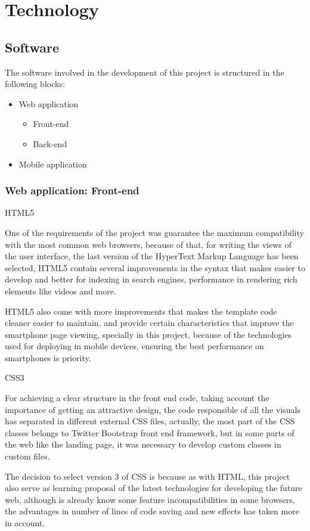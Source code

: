 \documentclass{DeustoFDP}
\begin{document}
\section{Technology}
\subsection{Software}
The software involved in the development of this project is structured in the following blocks:
\begin{itemize}
	\item Web application
	\begin{itemize}
		\item Front-end
		\item Back-end
	\end{itemize}
	\item Mobile application
\end{itemize}

\subsubsection{Web application: Front-end}
{\large HTML5}

One of the requirements of the project was guarantee the maximum compatibility with the most common web browsers, because of that, for writing the views of the user interface, the last version of the HyperText Markup Language has been selected, HTML5 contain several improvements in the syntax that makes easier to develop and better for indexing in search engines, performance in rendering rich elements like videos and more.

HTML5 also come with more improvements that makes the template code cleaner easier to maintain, and provide certain characteristics that improve the smartphone page viewing, specially in this project, because of the technologies used for deploying in mobile devices, ensuring the best performance on smartphones is priority.

{\large CSS3}

For achieving a clear structure in the front end code, taking account the importance of getting an attractive design, the code responsible of all the visuals has separated in different external CSS files, actually, the most part of the CSS classes belongs to Twitter Bootstrap front end framework, but in some parts of the web like the landing page, it was necessary to develop custom classes in custom files.

The decision to select version 3 of CSS is because as with HTML, this project also serve as learning proposal of the latest technologies for developing the future web, although is already know some feature incompatibilities in some browsers, the advantages in number of lines of code saving and new effects has taken more in account.
\end{document}
